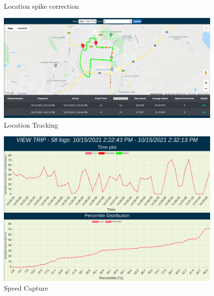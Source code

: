 \begin{figure}[H]
\centering
\caption{Location spike correction}
\label{fig:spike_correction}
\end{figure}

\begin{figure}[H]
\centering
\includegraphics[width=6in]{eval_location.png}
\caption{Location Tracking}
\label{fig:eval_location}
\end{figure}

\begin{figure}[H]
\centering
\includegraphics[width=5in]{eval_speed.png}
\caption{Speed Capture}
\label{fig:eval_speed}
\end{figure}

